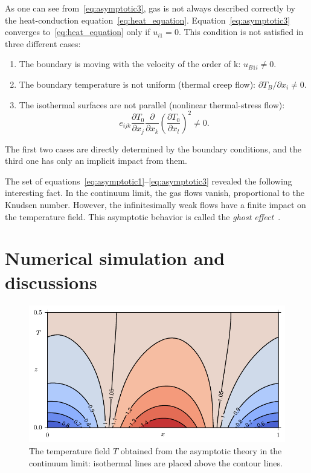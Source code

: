 \documentclass[smallextended, referee]{svjour3} %
\newcommand{\pder}[2][]{\frac{\partial#1}{\partial#2}}
\newcommand{\Pder}[2][]{\partial#1/\partial#2}
\begin{document}
As one can see from~\eqref{eq:asymptotic3}, gas is not always described correctly
by the heat-conduction equation~\eqref{eq:heat_equation}.
Equation~\eqref{eq:asymptotic3} converges to~\eqref{eq:heat_equation} only if \(u_{i1} = 0\).
This condition is not satisfied in three different cases:
\begin{enumerate}
	\item The boundary is moving with the velocity of the order of k: \(u_{B1i} \neq 0 \).
	\item The boundary temperature is not uniform (thermal creep flow): \(\Pder[T_B]{x_i} \neq 0 \).
	\item The isothermal surfaces are not parallel (nonlinear thermal-stress flow):
		\begin{equation}\label{eq:equilibrium}
			e_{ijk}\pder[T_0]{x_j}\pder{x_k}\left(\pder[T_0]{x_l}\right)^2 \neq 0.
		\end{equation}
\end{enumerate}

The first two cases are directly determined by the boundary conditions,
and the third one has only an implicit impact from them.

The set of equations~\eqref{eq:asymptotic1}--\eqref{eq:asymptotic3} revealed the following interesting fact.
In the continuum limit, the gas flows vanish, proportional to the Knudsen number.
However, the infinitesimally weak flows have a finite impact on the temperature field.
This asymptotic behavior is called the \emph{ghost effect}~\cite{GhostEffect, Sone2002, Sone2007}.

\section{Numerical simulation and discussions}

\begin{figure}[ht]
	\centering
	\includegraphics{Fig3}
	\caption{The temperature field \(T\) obtained from the asymptotic theory in the continuum limit:
		isothermal lines are placed above the contour lines.}
	\label{fig:moving:T_asym}
\end{figure}
\end{document}
